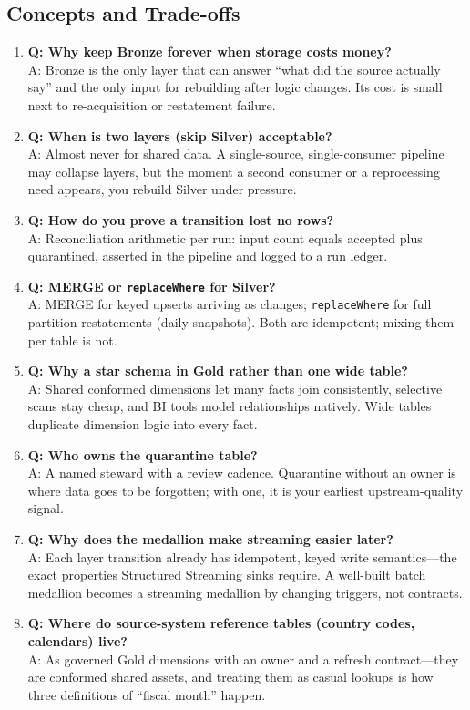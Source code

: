 \subsection{Concepts and Trade-offs}
\begin{enumerate}
    \item \textbf{Q: Why keep Bronze forever when storage costs money?}\\
    A: Bronze is the only layer that can answer ``what did the source actually say'' and the only input for rebuilding after logic changes. Its cost is small next to re-acquisition or restatement failure.
    \item \textbf{Q: When is two layers (skip Silver) acceptable?}\\
    A: Almost never for shared data. A single-source, single-consumer pipeline may collapse layers, but the moment a second consumer or a reprocessing need appears, you rebuild Silver under pressure.
    \item \textbf{Q: How do you prove a transition lost no rows?}\\
    A: Reconciliation arithmetic per run: input count equals accepted plus quarantined, asserted in the pipeline and logged to a run ledger.
    \item \textbf{Q: MERGE or \texttt{replaceWhere} for Silver?}\\
    A: MERGE for keyed upserts arriving as changes; \texttt{replaceWhere} for full partition restatements (daily snapshots). Both are idempotent; mixing them per table is not.
    \item \textbf{Q: Why a star schema in Gold rather than one wide table?}\\
    A: Shared conformed dimensions let many facts join consistently, selective scans stay cheap, and BI tools model relationships natively. Wide tables duplicate dimension logic into every fact.
    \item \textbf{Q: Who owns the quarantine table?}\\
    A: A named steward with a review cadence. Quarantine without an owner is where data goes to be forgotten; with one, it is your earliest upstream-quality signal.
    \item \textbf{Q: Why does the medallion make streaming easier later?}\\
    A: Each layer transition already has idempotent, keyed write semantics---the exact properties Structured Streaming sinks require. A well-built batch medallion becomes a streaming medallion by changing triggers, not contracts.
    \item \textbf{Q: Where do source-system reference tables (country codes, calendars) live?}\\
    A: As governed Gold dimensions with an owner and a refresh contract---they are conformed shared assets, and treating them as casual lookups is how three definitions of ``fiscal month'' happen.
\end{enumerate}

